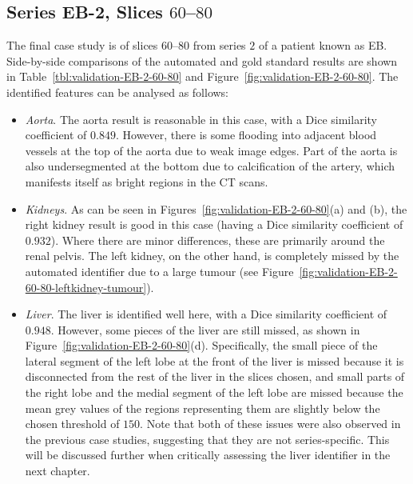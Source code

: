 \afterpage{\clearpage}
\newpage

\subsection{Series EB-2, Slices $60$--$80$}

The final case study is of slices $60$--$80$ from series $2$ of a patient known as EB. Side-by-side comparisons of the automated and gold standard results are shown in Table~\ref{tbl:validation-EB-2-60-80} and Figure~\ref{fig:validation-EB-2-60-80}. The identified features can be analysed as follows:
%
\begin{itemize}

\item \emph{Aorta}. The aorta result is reasonable in this case, with a Dice similarity coefficient of $0.849$. However, there is some flooding into adjacent blood vessels at the top of the aorta due to weak image edges. Part of the aorta is also undersegmented at the bottom due to calcification of the artery, which manifests itself as bright regions in the CT scans.

\item \emph{Kidneys}. As can be seen in Figures~\ref{fig:validation-EB-2-60-80}(a) and (b), the right kidney result is good in this case (having a Dice similarity coefficient of $0.932$). Where there are minor differences, these are primarily around the renal pelvis. The left kidney, on the other hand, is completely missed by the automated identifier due to a large tumour (see Figure~\ref{fig:validation-EB-2-60-80-leftkidney-tumour}).

\item \emph{Liver}. The liver is identified well here, with a Dice similarity coefficient of $0.948$. However, some pieces of the liver are still missed, as shown in Figure~\ref{fig:validation-EB-2-60-80}(d). Specifically, the small piece of the lateral segment of the left lobe at the front of the liver is missed because it is disconnected from the rest of the liver in the slices chosen, and small parts of the right lobe and the medial segment of the left lobe are missed because the mean grey values of the regions representing them are slightly below the chosen threshold of $150$. Note that both of these issues were also observed in the previous case studies, suggesting that they are not series-specific. This will be discussed further when critically assessing the liver identifier in the next chapter.


\end{itemize}
